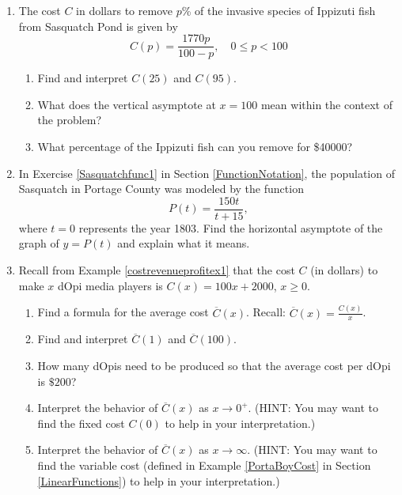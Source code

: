 \begin{enumerate}
\setcounter{enumi}{\value{HW}}

\item The cost $C$ in dollars to remove $p$\% of the invasive species of Ippizuti fish from Sasquatch Pond is given by \[C(p) = \frac{1770p}{100 - p}, \quad 0 \leq p < 100 \]

\begin{enumerate}

\item Find and interpret $C(25)$ and $C(95)$.
\item What does the vertical asymptote at $x = 100$ mean within the context of the problem?  
\item What percentage of the Ippizuti fish can you remove for  \$40000?

\end{enumerate}


\item In Exercise \ref{Sasquatchfunc1} in Section \ref{FunctionNotation}, the population of Sasquatch in Portage County was modeled by the function \[P(t) = \frac{150t}{t + 15},\] where $t = 0$ represents the year 1803.  Find the horizontal asymptote of the graph of $y = P(t)$ and explain what it means.

\item  Recall from Example \ref{costrevenueprofitex1} that the cost $C$ (in dollars) to make $x$ dOpi media players is $C(x) = 100x+2000$, $x \geq 0$.  

\begin{enumerate}

\item  Find a formula for the average cost $\overline{C}(x)$. Recall:  $\overline{C}(x) = \frac{C(x)}{x}$.

\item  Find and interpret $\overline{C}(1)$ and $\overline{C}(100)$.

\item  How many dOpis need to be produced so that the average cost per dOpi is $\$ 200$?

\item  Interpret the behavior of $\overline{C}(x)$ as $x \rightarrow 0^{+}$.  (HINT:  You may want to find the fixed cost $C(0)$ to help in your interpretation.)

\item  Interpret the behavior of $\overline{C}(x)$ as $x \rightarrow \infty$.  (HINT:  You may want to find the variable cost (defined in Example \ref{PortaBoyCost} in Section \ref{LinearFunctions}) to help in your interpretation.)



\end{enumerate}
\end{enumerate}
